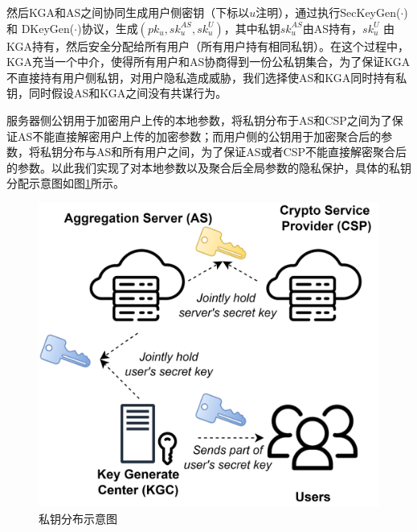 然后KGA和AS之间协同生成用户侧密钥（下标以$ u $注明），通过执行SecKeyGen($\cdot$) 和 DKeyGen($\cdot$)协议，生成$(pk_u, sk_{u}^{AS}, sk_{u}^{U})$，其中私钥$ sk_{u}^{AS} $由AS持有，$ sk_{u}^{U} $ 由KGA持有，然后安全分配给所有用户（所有用户持有相同私钥）。在这个过程中，KGA充当一个中介，使得所有用户和AS协商得到一份公私钥集合，为了保证KGA不直接持有用户侧私钥，对用户隐私造成威胁，我们选择使AS和KGA同时持有私钥，同时假设AS和KGA之间没有共谋行为。

服务器侧公钥用于加密用户上传的本地参数，将私钥分布于AS和CSP之间为了保证AS不能直接解密用户上传的加密参数；而用户侧的公钥用于加密聚合后的参数，将私钥分布与AS和所有用户之间，为了保证AS或者CSP不能直接解密聚合后的参数。以此我们实现了对本地参数以及聚合后全局参数的隐私保护，具体的私钥分配示意图如图\ref{keypng}所示。

\begin{figure}[htbp]
	\begin{center}
		\includegraphics[scale=0.077]{img/key-v1.drawio.png}
		\caption{私钥分布示意图}
		\label{keypng}
	\end{center}
\end{figure}

